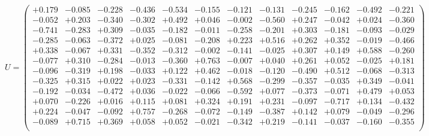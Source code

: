 \documentclass[9pt]{article}
\theoremstyle{plain}
\theoremstyle{definition}
\theoremstyle{remark}
\numberwithin{equation}{section}
\begin{document}
$U = \left(
\begin{array}{
cccccccccccc}
+0.179 & -0.085 & -0.228 & -0.436 & -0.534 & -0.155 & -0.121 & -0.131 & -0.245 & -0.162 & -0.492 & -0.221 \\
-0.052 & +0.203 & -0.340 & -0.302 & +0.492 & +0.046 & -0.002 & -0.560 & +0.247 & -0.042 & +0.024 & -0.360 \\
-0.741 & -0.283 & +0.309 & -0.035 & -0.182 & -0.011 & -0.258 & -0.201 & +0.303 & -0.181 & -0.093 & -0.029 \\
-0.285 & -0.063 & -0.372 & +0.025 & -0.081 & -0.208 & +0.223 & +0.516 & +0.262 & +0.352 & -0.019 & -0.466 \\
+0.338 & -0.067 & +0.331 & -0.352 & -0.312 & -0.002 & -0.141 & -0.025 & +0.307 & +0.149 & +0.588 & -0.260 \\
-0.077 & +0.310 & -0.284 & -0.013 & -0.360 & +0.763 & -0.007 & +0.040 & +0.261 & +0.052 & -0.025 & +0.181 \\
-0.096 & -0.319 & +0.198 & -0.033 & +0.122 & +0.462 & -0.018 & -0.120 & -0.490 & +0.512 & -0.068 & -0.313 \\
-0.325 & +0.315 & +0.022 & +0.023 & -0.331 & -0.142 & +0.568 & -0.299 & -0.357 & -0.035 & +0.349 & -0.041 \\
-0.192 & -0.034 & -0.472 & +0.036 & -0.022 & -0.066 & -0.592 & +0.077 & -0.373 & -0.071 & +0.479 & +0.053 \\
+0.070 & -0.226 & +0.016 & +0.115 & +0.081 & +0.324 & +0.191 & +0.231 & -0.097 & -0.717 & +0.134 & -0.432 \\
+0.224 & -0.047 & -0.092 & +0.757 & -0.268 & -0.072 & -0.149 & -0.387 & +0.142 & +0.079 & -0.049 & -0.296 \\
-0.089 & +0.715 & +0.369 & +0.058 & +0.052 & -0.021 & -0.342 & +0.219 & -0.141 & -0.037 & -0.160 & -0.355 \\
\end{array}
\right)$ \newline 
\end{document}
